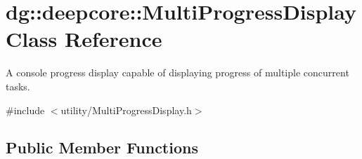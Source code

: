 \hypertarget{classdg_1_1deepcore_1_1_multi_progress_display}{}\section{dg\+:\+:deepcore\+:\+:Multi\+Progress\+Display Class Reference}
\label{classdg_1_1deepcore_1_1_multi_progress_display}


A console progress display capable of displaying progress of multiple concurrent tasks.  




{\ttfamily \#include $<$utility/\+Multi\+Progress\+Display.\+h$>$}

\subsection*{Public Member Functions}
